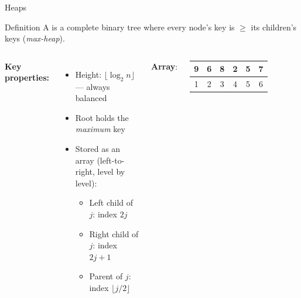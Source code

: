 \documentclass[aspectratio=169]{beamer}
\begin{document}
\begin{frame}[shrink=12]{Heaps}
  \begin{block}{Definition}
    A  is a complete binary tree where every node's key
    is $\geq$ its children's keys (\emph{max-heap}).
  \end{block}
  \vspace{0.3em}
  \begin{columns}[T]
      \textbf{Key properties:}
      \begin{itemize}
        \item Height: $\lfloor\log_2 n\rfloor$ — always balanced
        \item Root holds the \emph{maximum} key
        \item Stored as an array (left-to-right, level by level):
          \begin{itemize}
            \item Left child of $j$: index $2j$
            \item Right child of $j$: index $2j+1$
            \item Parent of $j$: index $\lfloor j/2\rfloor$
          \end{itemize}
      \end{itemize}

      \textbf{Array}: \quad
      \begin{tabular}{|c|c|c|c|c|c|}
        \hline
        \rowcolor{PrimaryLight!40}
        9 & 6 & 8 & 2 & 5 & 7 \\
        \hline
        1 & 2 & 3 & 4 & 5 & 6 \\
        \hline
      \end{tabular}
  \end{columns}
\end{frame}
\end{document}
